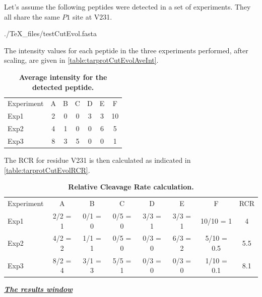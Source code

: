 Let's assume the following peptides were detected in a set of experiments. They all
share the same \(P1\) site at V231.

\begin{texshade}{./TeX_files/testCutEvol.fasta}
    \hideconsensus
\end{texshade}

The intensity values for each peptide in the three experiments performed, after scaling,
are given in \autoref{table:tarprotCutEvolAveInt}. 

\begin{table}[h!]
    \centering
    \begin{tabular}{lcccccc}
        \hline
        Experiment & A & B & C & D & E & F \\
        Exp1 & 2 & 0 & 0 & 3 & 3 & 10 \\
        Exp2 & 4 & 1 & 0 & 0 & 6 & 5 \\
        Exp3 & 8 & 3 & 5 & 0 & 0 & 1 \\
        \hline
    \end{tabular}
    \caption[Scaled average intensity for the detected peptide]{\textbf{Average intensity
    for the detected peptide.}}
    \label{table:tarprotCutEvolAveInt}
\end{table}

The RCR for residue V231 is then calculated as indicated in \autoref{table:tarprotCutEvolRCR}.

\begin{table}[h!]
    \centering
    \begin{tabular}{lccccccc}
        \hline
        Experiment & A       & B       & C       & D       & E       & F          & RCR\\
        Exp1       & 2/2 = 1 & 0/1 = 0 & 0/5 = 0 & 3/3 = 1 & 3/3 = 1 & 10/10 = 1  & 4  \\
        Exp2       & 4/2 = 2 & 1/1 = 1 & 0/5 = 0 & 0/3 = 0 & 6/3 = 2 & 5/10 = 0.5 & 5.5\\
        Exp3       & 8/2 = 4 & 3/1 = 3 & 5/5 = 1 & 0/3 = 0 & 0/3 = 0 & 1/10 = 0.1 & 8.1\\
        \hline
    \end{tabular}
    \caption[Relative Cleavage Rate calculation]{\textbf{Relative Cleavage Rate
    calculation.}}
    \label{table:tarprotCutEvolRCR}
\end{table}

\textit{\textbf{\underline{The results window}}}

